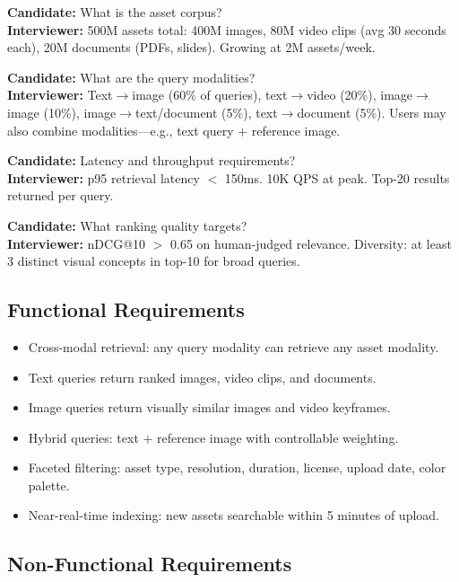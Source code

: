 \textbf{Candidate:} What is the asset corpus?\\
\textbf{Interviewer:} 500M assets total: 400M images, 80M video clips (avg 30 seconds each), 20M documents (PDFs, slides). Growing at 2M assets/week.

\textbf{Candidate:} What are the query modalities?\\
\textbf{Interviewer:} Text$\rightarrow$image (60\% of queries), text$\rightarrow$video (20\%), image$\rightarrow$image (10\%), image$\rightarrow$text/document (5\%), text$\rightarrow$document (5\%). Users may also combine modalities---e.g., text query + reference image.

\textbf{Candidate:} Latency and throughput requirements?\\
\textbf{Interviewer:} p95 retrieval latency $<$ 150ms. 10K QPS at peak. Top-20 results returned per query.

\textbf{Candidate:} What ranking quality targets?\\
\textbf{Interviewer:} nDCG@10 $>$ 0.65 on human-judged relevance. Diversity: at least 3 distinct visual concepts in top-10 for broad queries.

\subsection*{Functional Requirements}

\begin{itemize}
  \item Cross-modal retrieval: any query modality can retrieve any asset modality.
  \item Text queries return ranked images, video clips, and documents.
  \item Image queries return visually similar images and video keyframes.
  \item Hybrid queries: text + reference image with controllable weighting.
  \item Faceted filtering: asset type, resolution, duration, license, upload date, color palette.
  \item Near-real-time indexing: new assets searchable within 5 minutes of upload.
\end{itemize}

\subsection*{Non-Functional Requirements}

